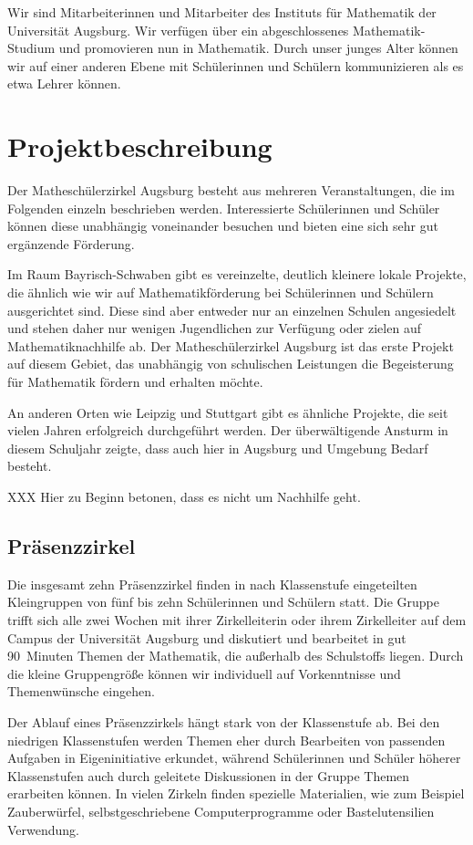 \documentclass[12pt]{zettel}
\begin{document}
Wir sind Mitarbeiterinnen und Mitarbeiter des Instituts für Mathematik der
Universität Augsburg. Wir verfügen über ein abgeschlossenes Mathematik-Studium
und promovieren nun in Mathematik. Durch unser junges Alter können wir auf
einer anderen Ebene mit Schülerinnen und Schülern kommunizieren als es etwa
Lehrer können.


\section{Projektbeschreibung}

Der Matheschülerzirkel Augsburg besteht aus mehreren Veranstaltungen, die im
Folgenden einzeln beschrieben werden. Interessierte Schülerinnen und Schüler
können diese unabhängig voneinander besuchen und bieten eine sich sehr gut
ergänzende Förderung.

Im Raum Bayrisch-Schwaben gibt es vereinzelte, deutlich kleinere lokale
Projekte, die ähnlich wie wir auf Mathematikförderung bei Schülerinnen und
Schülern ausgerichtet sind. Diese sind aber entweder nur an einzelnen Schulen
angesiedelt und stehen daher nur wenigen Jugendlichen zur Verfügung oder zielen
auf Mathematiknachhilfe ab. Der Matheschülerzirkel Augsburg ist das erste
Projekt auf diesem Gebiet, das unabhängig von schulischen Leistungen die
Begeisterung für Mathematik fördern und erhalten möchte.

An anderen Orten wie Leipzig und Stuttgart gibt es ähnliche Projekte, die seit
vielen Jahren erfolgreich durchgeführt werden. Der überwältigende Ansturm in
diesem Schuljahr zeigte, dass auch hier in Augsburg und Umgebung Bedarf
besteht.

XXX Hier zu Beginn betonen, dass es nicht um Nachhilfe geht.


\subsection{Präsenzzirkel}

Die insgesamt zehn Präsenzzirkel finden in nach Klassenstufe eingeteilten
Kleingruppen von fünf bis zehn Schülerinnen und Schülern statt.
Die Gruppe trifft sich alle zwei Wochen mit ihrer Zirkelleiterin oder ihrem
Zirkelleiter auf dem Campus der Universität Augsburg und diskutiert und
bearbeitet in gut 90~Minuten Themen der Mathematik, die außerhalb des
Schulstoffs liegen. Durch die kleine Gruppengröße können wir individuell auf
Vorkenntnisse und Themenwünsche eingehen.

Der Ablauf eines Präsenzzirkels hängt stark von der Klassenstufe ab. Bei den
niedrigen Klassenstufen werden Themen eher durch Bearbeiten von passenden
Aufgaben in Eigeninitiative erkundet, während Schülerinnen und Schüler höherer
Klassenstufen auch durch geleitete Diskussionen in der Gruppe
Themen erarbeiten können. In vielen Zirkeln finden spezielle Materialien,
wie zum Beispiel Zauberwürfel, selbstgeschriebene Computerprogramme oder
Bastelutensilien Verwendung.
\end{document}
